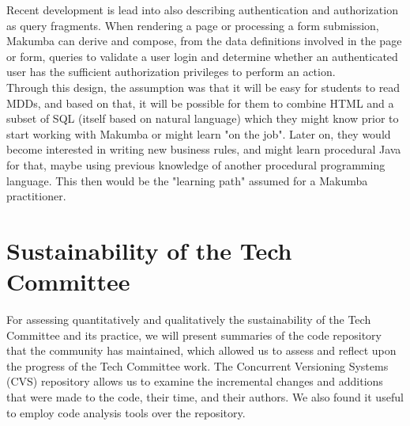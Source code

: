 \documentclass{llncs}
\begin{document}
Recent development is lead into also describing authentication and authorization as query fragments. When rendering a page or processing a form submission, Makumba can derive and compose, from the data definitions involved in the page or form, queries to validate a user login and determine whether an authenticated user has the sufficient authorization privileges to perform an action.\\


Through this design, the assumption was that it will be easy for students to read MDDs, and based on that, it will be possible for them to combine HTML and a subset of SQL (itself based on natural language) which they might know prior to start working with Makumba or might learn "on the job". Later on, they would become interested in writing new business rules, and might learn procedural Java for that, maybe using previous knowledge of another procedural programming language. This then would be the "learning path" assumed for a Makumba practitioner.



\section{Sustainability of the Tech Committee}\label{sec:techCommittee}

For assessing quantitatively and qualitatively the sustainability of the Tech Committee and its practice, we will present summaries of the code repository that the community has maintained, which allowed us to assess and reflect upon the progress of the Tech Committee work. The Concurrent Versioning Systems (CVS) repository allows us to examine the incremental changes and additions that were made to the code, their time, and their authors. We also found it useful to employ code analysis tools over the repository.
\end{document}
